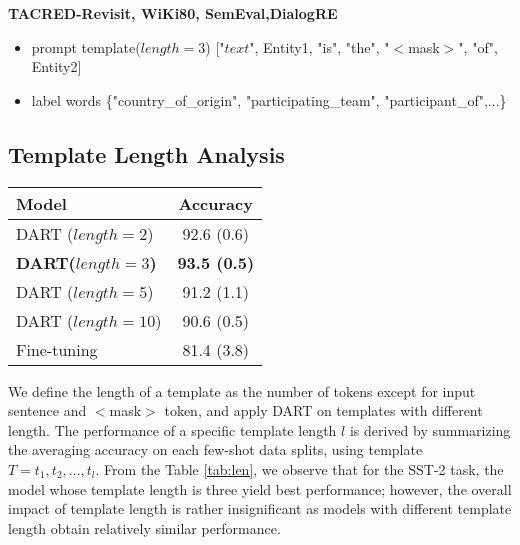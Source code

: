 \documentclass{article} \usepackage{iclr2022_conference,times}
\begin{document}
\textbf{TACRED-Revisit, WiKi80, SemEval,DialogRE}
\begin{itemize}
\item prompt template($length=3$)
["$text$", Entity1, "is", "the", "$<$mask$>$", "of", Entity2]
\item label words
\{"country\_of\_origin", "participating\_team", "participant\_of",...\}
\end{itemize}
 {
 \color{highlight}
 
 
 


 
 
 
 
\subsection{Template Length Analysis}


\begin{table*}[h]
\begin{center}
\centering
\begin{tabular}{l  c}
\toprule
\textbf{Model}  & \textbf{Accuracy} \\

\midrule
DART ($length=2$) &  92.6 (0.6) \\
\textbf{DART($length=3$)} &  \textbf{93.5 (0.5)} \\
DART ($length=5$)  & 91.2 (1.1) \\
DART ($length=10$) & 90.6 (0.5) \\
Fine-tuning &  81.4 (3.8) \\
\bottomrule
\end{tabular}
\end{center}
\caption{Few-shot performance on SST-2 task using templates with different length.
}
\vspace{-15pt}
    \label{tab:len}
\end{table*}

We define the length of a template as the number of tokens except for input sentence and $<$mask$>$ token, and apply DART on templates with different length. 
The performance of a specific template length $l$ is derived by summarizing the averaging accuracy on each few-shot data splits, using template $T={t_{1},t_{2},...,t_{l}}$. 
From the Table \ref{tab:len}, we observe that for the SST-2 task, the model whose template length is three yield best performance; however, the overall impact of template length is rather insignificant as models with different template length obtain relatively similar performance.













}
\end{document}
